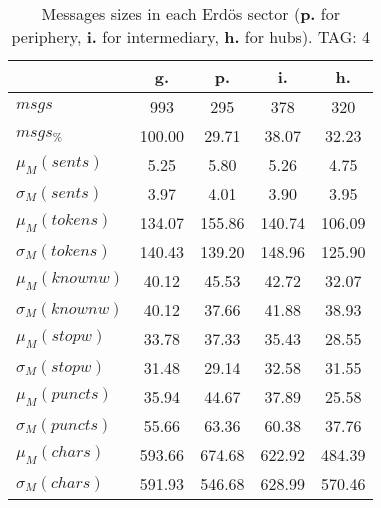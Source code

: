 \begin{table}[h!]
\begin{center}
\begin{tabular}{| l | c | c | c | c |}\hline
 & g. & p. & i. & h. \\\hline
$msgs$ & 993  & 295  & 378  & 320 \\\hline
$msgs_{\%}$ & 100.00  & 29.71  & 38.07  & 32.23 \\\hline
$\mu_M(sents)$ & 5.25  & 5.80  & 5.26  & 4.75 \\\hline
$\sigma_M(sents)$ & 3.97  & 4.01  & 3.90  & 3.95 \\\hline
$\mu_M(tokens)$ & 134.07  & 155.86  & 140.74  & 106.09 \\\hline
$\sigma_M(tokens)$ & 140.43  & 139.20  & 148.96  & 125.90 \\\hline
$\mu_M(knownw)$ & 40.12  & 45.53  & 42.72  & 32.07 \\\hline
$\sigma_M(knownw)$ & 40.12  & 37.66  & 41.88  & 38.93 \\\hline
$\mu_M(stopw)$ & 33.78  & 37.33  & 35.43  & 28.55 \\\hline
$\sigma_M(stopw)$ & 31.48  & 29.14  & 32.58  & 31.55 \\\hline
$\mu_M(puncts)$ & 35.94  & 44.67  & 37.89  & 25.58 \\\hline
$\sigma_M(puncts)$ & 55.66  & 63.36  & 60.38  & 37.76 \\\hline
$\mu_M(chars)$ & 593.66  & 674.68  & 622.92  & 484.39 \\\hline
$\sigma_M(chars)$ & 591.93  & 546.68  & 628.99  & 570.46 \\\hline
\end{tabular}
\caption{Messages sizes in each Erd\"os sector ({{\bf p.}} for periphery, {{\bf i.}} for intermediary, {{\bf h.}} for hubs). TAG: 4}
\end{center}
\end{table}